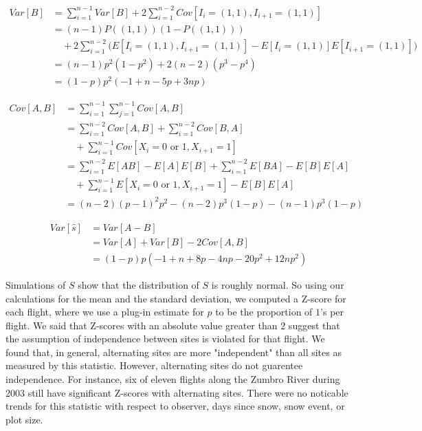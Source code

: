 \documentclass{article}
\begin{document}
    \begin{equation*}
        \begin{split}
        Var[B]& =\sum_{i=1}^{n-1}Var[B]+2\sum_{i=1}^{n-2}Cov[I_i=(1,1),I_{i+1}=
                (1,1)] \\
              & =(n-1)P((1, 1))(1-P((1, 1))) \\
              & \quad +2\sum_{i=1}^{n-2}\bigg(E[I_i=(1,1),I_{i+1}=(1,1)]-E[I_i=
                (1,1)]E[I_{i+1}=(1,1)]\bigg) \\
              & =(n-1)p^2(1-p^2)+2(n-2)(p^3-p^4) \\
              & =(1-p)p^2(-1+n-5p+3np)
        \end{split}
    \end{equation*}

    \begin{equation*}
        \begin{split}
        Cov[A,B]& =\sum_{i=1}^{n-1}\sum_{j=1}^{n-1}Cov[A,B] \\
                & =\sum_{i=1}^{n-2}Cov[A,B]+\sum_{i=1}^{n-2}Cov[B,A] \\
                & \quad +\sum_{i=1}^{n-1}Cov[X_i=0\text{ or }1,X_{i+1}=1] \\
                & =\sum_{i=1}^{n-2}E[AB]-E[A]E[B]+\sum_{i=1}^{n-2}E[BA]-
                  E[B]E[A] \\
                & \quad +\sum_{i=1}^{n-1}E[X_i=0\text{ or }1,X_{i+1}=1]-
                  E[B]E[A] \\
                & =(n-2)(p-1)^2p^2-(n-2)p^3(1-p)-(n-1)p^3(1-p)
        \end{split}
    \end{equation*}
	
    \begin{equation*}
        \begin{split}
        Var[\hat{s}]& =Var[A-B] \\
                    & =Var[A]+Var[B]-2Cov[A,B] \\
                    & =(1-p)p(-1+n+8p-4np-20p^2+12np^2)
        \end{split}
    \end{equation*}

	Simulations of \(S\) show that the distribution of \(S\) is roughly normal.  
So using our calculations for the mean and the standard deviation, we computed
a Z-score for each flight, where we use a plug-in estimate for \(p\) to be the 
proportion of \(1\)'s per flight.  We said that Z-scores with an absolute value 
greater than \(2\) suggest that the assumption of independence between sites is 
violated for that flight.  We found that, in general, alternating sites are more
"independent" than all sites as measured by this statistic.  However, alternating
sites do not guarentee independence.  For instance, six of eleven flights along 
the Zumbro River during 2003 still have significant Z-scores with alternating
sites.  There were no noticable trends for this statistic with respect to 
observer, days since snow, snow event, or plot size.
\end{document}
